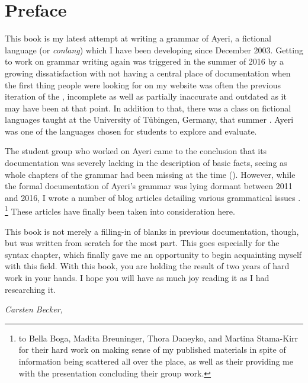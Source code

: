 \chapter{Preface}

This book is my latest attempt at writing a grammar of Ayeri, a fictional
language (or \emph{conlang}) which I have been developing since December
2003. Getting to work on grammar writing again was triggered in the summer of
2016 by a growing dissatisfaction with not having a central place of
documentation when the first thing people were looking for on my website was
often the previous iteration of the , incomplete as well as
partially inaccurate and outdated as it may have been at that point. In
addition to that, there was a class on fictional languages taught at the
University of Tübingen, Germany, that summer \autocite{buch2016ss}. Ayeri was
one of the languages chosen for students to explore and evaluate.

The student group who worked on Ayeri came to the conclusion that its
documentation was severely lacking in the description of basic facts, seeing as
whole chapters of the grammar had been missing at the time
(\cite[12]{boga2016}). However, while the formal documentation of Ayeri's
grammar was lying dormant between 2011 and 2016, I wrote a number of blog
articles detailing various grammatical issues \autocite[Blog]{benung}.%
\footnote{ to Bella Boga, Madita
Breuninger, Thora Daneyko, and Martina Stama-Kirr for their hard work on making
sense of my published materials in spite of information being scattered all
over the place, as well as their providing me with the presentation concluding
their group work.} These articles have finally been taken into consideration
here.

This book is not merely a filling-in of blanks in previous documentation,
though, but was written from scratch for the most part. This goes especially
for the syntax chapter, which finally gave me an opportunity to begin
acquainting myself with this field. With this book, you are holding the result
of two years of hard work in your hands. I hope you will have as much joy
reading it as I had researching it.

\begin{flushright}\itshape\footnotesize
{}
Carsten Becker,  \the\year
\end{flushright}
